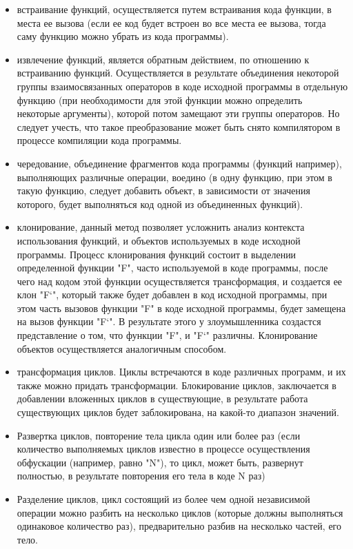 \begin{itemize}
\item встраивание функций, осуществляется путем встраивания кода функции, в места ее вызова (если ее код будет встроен во все места ее вызова, тогда саму функцию можно убрать из кода программы). 
\item извлечение функций, является обратным действием, по отношению к встраиванию функций. Осуществляется в результате объединения некоторой группы взаимосвязанных операторов в коде исходной программы в отдельную функцию (при необходимости для этой функции можно определить некоторые аргументы), которой потом замещают эти группы операторов. Но следует учесть, что такое преобразование может быть снято компилятором в процессе компиляции кода программы.
\item чередование, объединение фрагментов кода программы (функций например), выполняющих различные операции, воедино (в одну функцию, при этом в такую функцию, следует добавить объект, в зависимости от значения которого, будет выполняться код одной из объединенных функций).
\item клонирование, данный метод позволяет усложнить анализ контекста использования функций, и объектов используемых в коде исходной программы. Процесс клонирования функций состоит в выделении определенной функции "F", часто используемой в коде программы, после чего над кодом этой функции осуществляется трансформация, и создается ее клон "F`", который также будет добавлен в код исходной программы, при этом часть вызовов функции "F" в коде исходной программы, будет замещена на вызов функции "F`". В результате этого у злоумышленника создастся представление о том, что функции "F", и "F`" различны. Клонирование объектов осуществляется аналогичным способом.
\item трансформация циклов. Циклы встречаются в коде различных программ, и их также можно придать трансформации. Блокирование циклов, заключается в добавлении вложенных циклов в существующие, в результате работа существующих циклов будет заблокирована, на какой-то диапазон значений.
\item Развертка циклов, повторение тела цикла один или более раз (если количество выполняемых циклов известно в процессе осуществления обфускации (например, равно "N"), то цикл, может быть, развернут полностью, в результате повторения его тела в коде N раз)
\item Разделение циклов, цикл состоящий из более чем одной независимой операции можно разбить на несколько циклов (которые должны выполняться одинаковое количество раз), предварительно разбив на несколько частей, его тело.
\end{itemize}

